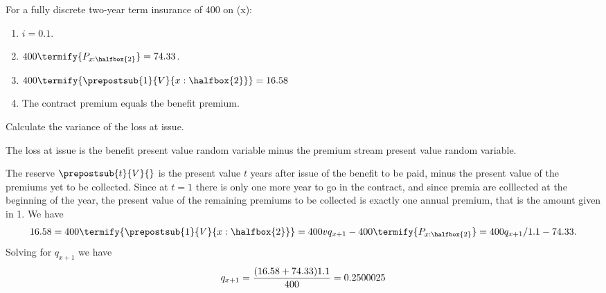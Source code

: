  For a fully discrete two-year term insurance of 400 on (x):
\begin{enumerate}
\item  $i = 0.1$.
\medskip
\item  $400\termify{P_{x:\halfbox{2}}} = 74.33$.
\medskip
\item $400\termify{\prepostsub{1}{V}{x:\halfbox{2}}} = 16.58$
\medskip
\item The contract premium equals the benefit premium.
\end{enumerate}

\bigskip

Calculate the variance of the loss at issue.


\bsoln 
The loss at issue is the benefit present value random variable minus 
the premium stream present value random variable. 

 The reserve $\prepostsub{t}{V}{}$ is the present value $t$ years after 
issue of the benefit to be paid, minus the present value of the premiums 
yet to be collected. Since at $t=1$ there is only one more year to 
go in the contract, and since premia are colllected at the beginning 
of the year, the present value of the remaining premiums to be collected
is exactly one annual premium, that is the amount given in 1. We have
\[
 16.58 = 400\termify{\prepostsub{1}{V}{x:\halfbox{2}}} 
 = 400 vq_{x+1} - 400\termify{P_{x:\halfbox{2}}} 
 = 400q_{x+1}/1.1 - 74.33.
\]
Solving for $q_{x+1}$ we have
\[
  q_{x+1} = {(16.58 + 74.33)1.1\over 400} = 0.2500025
\]

\esoln

